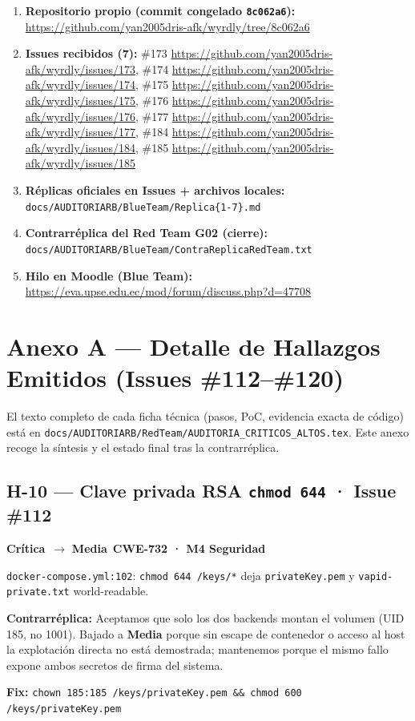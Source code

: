 \documentclass[10pt,a4paper]{article}
\newcommand{\code}[1]{\nolinkurl{#1}}
\newcommand{\badgeCritica}{\colorbox{red!20}{\textcolor{red!80!black}{\textbf{\footnotesize Crítica}}}}
\newcommand{\badgeMedia}{\colorbox{yellow!35}{\textcolor{brown!90!black}{\textbf{\footnotesize Media}}}}
\begin{document}
\begin{enumerate}[leftmargin=*]
  \item \textbf{Repositorio propio (commit congelado \code{8c062a6}):} \url{https://github.com/yan2005dris-afk/wyrdly/tree/8c062a6}
  \item \textbf{Issues recibidos (7):} \#173 \url{https://github.com/yan2005dris-afk/wyrdly/issues/173}, \#174 \url{https://github.com/yan2005dris-afk/wyrdly/issues/174}, \#175 \url{https://github.com/yan2005dris-afk/wyrdly/issues/175}, \#176 \url{https://github.com/yan2005dris-afk/wyrdly/issues/176}, \#177 \url{https://github.com/yan2005dris-afk/wyrdly/issues/177}, \#184 \url{https://github.com/yan2005dris-afk/wyrdly/issues/184}, \#185 \url{https://github.com/yan2005dris-afk/wyrdly/issues/185}
  \item \textbf{Réplicas oficiales en Issues + archivos locales:} \code{docs/AUDITORIARB/BlueTeam/Replica\{1-7\}.md}
  \item \textbf{Contrarréplica del Red Team G02 (cierre):} \code{docs/AUDITORIARB/BlueTeam/ContraReplicaRedTeam.txt}
  \item \textbf{Hilo en Moodle (Blue Team):} \url{https://eva.upse.edu.ec/mod/forum/discuss.php?d=47708}
\end{enumerate}

\newpage
\section*{Anexo A — Detalle de Hallazgos Emitidos (Issues \#112–\#120)}

\noindent\small El texto completo de cada ficha técnica (pasos, PoC, evidencia exacta de código) está en \code{docs/AUDITORIARB/RedTeam/AUDITORIA\_CRITICOS\_ALTOS.tex}. Este anexo recoge la síntesis y el estado final tras la contrarréplica.

\vspace{0.5em}
\subsection*{H-10 — Clave privada RSA \texttt{chmod 644} · Issue \#112}
\badgeCritica\ $\rightarrow$ \badgeMedia\ \quad \textbf{CWE-732 · M4 Seguridad}

\noindent\code{docker-compose.yml:102}: \code{chmod 644 /keys/*} deja \code{privateKey.pem} y \code{vapid-private.txt} world-readable.\par
\noindent\textbf{Contrarréplica:} Aceptamos que solo los dos backends montan el volumen (UID 185, no 1001). Bajado a \textbf{Media} porque sin escape de contenedor o acceso al host la explotación directa no está demostrada; mantenemos porque el mismo fallo expone ambos secretos de firma del sistema.\par
\noindent\textbf{Fix:} \code{chown 185:185 /keys/privateKey.pem \&\& chmod 600 /keys/privateKey.pem}
\end{document}

